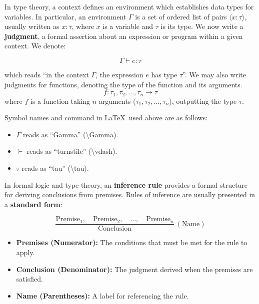 \begin{Def}

    In type theory, a context defines an environment which establishes data types for variables.
    In particular, an environment $\Gamma$ is a set of ordered list of pairs $\langle x : \tau \rangle$, usually written as $x : \tau$,
    where $x$ is a variable and $\tau$ is its type. We now write a \textbf{judgment},
    a formal assertion about an expression or program within a given context. We denote:\LARGE

    \vspace{-1em}
    \[\Gamma \vdash e: \tau\]

    \normalsize 
    \noindent
    which reads ``in the context $\Gamma$, the expression $e$ has type $\tau$''. 
    We may also write judgments for functions, denoting the type of the function and its arguments.
    \LARGE
    \[ f : \tau_1, \tau_2, \ldots, \tau_n \rightarrow \tau \]
    \normalsize
    \noindent 
    where $f$ is a function taking $n$ arguments ($\tau_1, \tau_2, \ldots, \tau_n$), outputting the type $\tau$.
    
    \hfill \cite{WikipediaTypingEnvironment}
\end{Def}

\vspace{-1em}
\begin{Tip}
    Symbol names and command in \LaTeX \ used above are as follows:
    \begin{itemize}
        \item $\Gamma$ reads as ``Gamma'' (\textbackslash Gamma).
        \item $\vdash$ reads as ``turnstile'' (\textbackslash vdash).
        \item $\tau$ reads as ``tau'' (\textbackslash tau).
    \end{itemize}
\end{Tip}

\newpage 

\begin{Def}

    In formal logic and type theory, an \textbf{inference rule} provides a formal structure for deriving conclusions from premises. 
    Rules of inference are usually presented in a \textbf{standard form}: \Large

    \[
    \frac{\text{Premise}_1, \quad \text{Premise}_2, \quad \ldots, \quad \text{Premise}_n}{\text{Conclusion}} \ (\text{Name})
    \]

    \normalsize
    \begin{itemize}
        \item \textbf{Premises (Numerator):} The conditions that must be met for the rule to apply.
        \item \textbf{Conclusion (Denominator):} The judgment derived when the premises are satisfied.
        \item \textbf{Name (Parentheses):} A label for referencing the rule. \hfill \cite{wiki:rule_of_inference}
    \end{itemize}
\end{Def}

